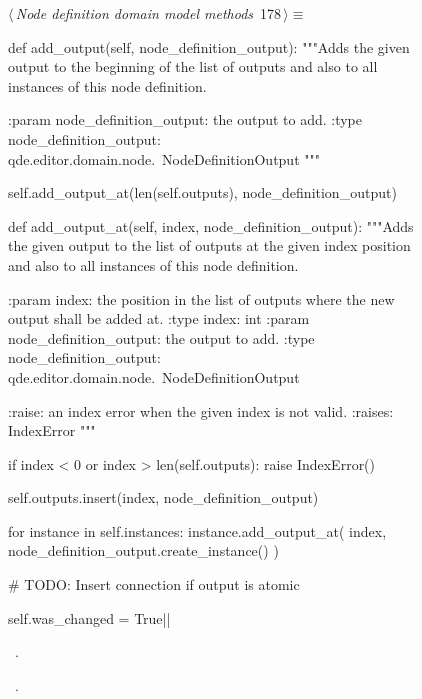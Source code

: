 \documentclass[%
    a4paper,    %
    justified,  %
    nobib,      %
    openany     %
]{tufte-book}
\makeatletter
\renewcommand{\label}[1]{\@tufte@label{##1}}%
\makeatother
\begin{document}
\begin{figure}[!htbp]
\begin{flushleft} \small
\begin{minipage}{\linewidth}\label{scrap149}\raggedright\small
{} $\langle\,${\itshape Node definition domain model methods}\nobreak\ {\footnotesize {178}}$\,\rangle\equiv$
\vspace{-1ex}
\begin{pythoncode}
def add_output(self, node_definition_output):
    """Adds the given output to the beginning of the list of
outputs and also to all instances of this node definition.

    :param node_definition_output: the output to add.
    :type  node_definition_output: qde.editor.domain.node.\
                           NodeDefinitionOutput
    """

    self.add_output_at(len(self.outputs), node_definition_output)

def add_output_at(self, index, node_definition_output):
    """Adds the given output to the list of outputs at the given
    index position and also to all instances of this node
    definition.

    :param index: the position in the list of outputs where the
                  new output shall be added at.
    :type  index: int
    :param node_definition_output: the output to add.
    :type  node_definition_output: qde.editor.domain.node.\
                                   NodeDefinitionOutput

    :raise: an index error when the given index is not valid.
    :raises: IndexError
    """

    if index < 0 or index > len(self.outputs):
        raise IndexError()

    self.outputs.insert(index, node_definition_output)

    for instance in self.instances:
        instance.add_output_at(
            index,
            node_definition_output.create_instance()
        )

    # TODO: Insert connection if output is atomic

    self.was_changed = True|\NWsep|
\end{pythoncode}
\vspace{1.5ex}
\footnotesize
\begin{list}{}{\setlength{\itemsep}{-\parsep}\setlength{\itemindent}{-\leftmargin}}
\item \NWtxtMacroDefBy\ .
\item \NWtxtMacroRefIn\ \NWlink{nuweb157b}{157b}.


\end{list}
\end{minipage}
\end{flushleft}
\end{figure}
\end{document}
